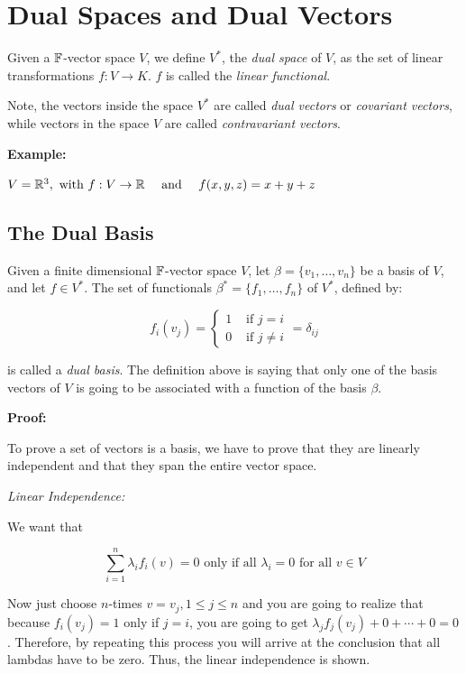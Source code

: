 \chapter{Dual Spaces and Dual Vectors}

Given a \(\mathbb{F}\)-vector space \(V\), we define \(V^*\), the \emph{dual space} of \(V\), as the set
of linear transformations \(f: V \to K\). \(f\) is called the \emph{linear functional}.

Note, the vectors inside the space \(V^*\) are called \emph{dual vectors} or \emph{covariant vectors}, while vectors in the 
space \(V\) are called \emph{contravariant vectors}.

\textbf{Example:}

\(V = \mathbb{R}^3, \text{ with } f: V \to \mathbb{R} \quad \text{ and } \quad f(x,y,z) = x + y + z\)

\section{The Dual Basis}

Given a finite dimensional \(\mathbb{F}\)-vector space \(V\), let \(\beta = \{v_1, \dots, v_n\}\) be a
basis of \(V\), and let \(f \in V^*\). The set of functionals \(\beta^* = \{f_1, \dots, f_n\}\) of
\(V^*\), defined by:

\[
    f_i(v_j) = \begin{cases}
        1 & \text{ if } j = i   \\
        0 & \text{ if } j \ne i
    \end{cases} = \delta_{ij}
\]

is called a \emph{dual basis}. The definition above is saying that only one of the basis vectors
of \(V\) is going to be associated with a function of the basis \(\beta\).

\textbf{Proof:}

To prove a set of vectors is a basis, we have to prove that they are linearly independent and that
they span the entire vector space.

\emph{Linear Independence:}

We want that

\[
    \sum_{i = 1}^{n} \lambda_i f_i(v) = 0 \text{ only if all } \lambda_i = 0 \text{ for all } v \in V
\]

Now just choose \(n\)-times \(v = v_j, 1 \le j \le n\) and you are going to realize that
because \(f_i(v_j) = 1\) only if \(j = i\), you are going to get \(\lambda_j f_j(v_j) + 0 + \cdots + 0 =
0\). Therefore, by repeating this process you will arrive at the conclusion that all lambdas have
to be zero. Thus, the linear independence is shown.

